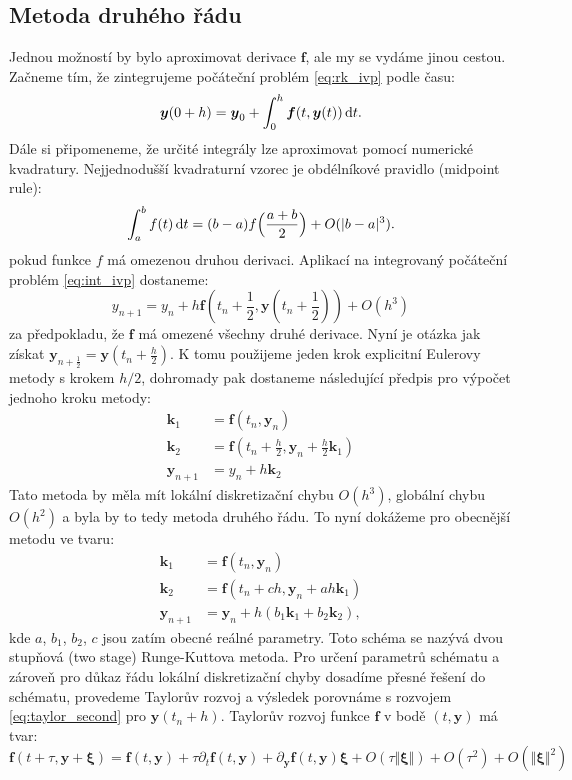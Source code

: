 \documentclass[a4paper, 12pt]{book}
\theoremstyle{definition}
\def\d{\,{\rm d}}               %
\def\vc#1{\mathbf{\boldsymbol{#1}}}     %
\def\abs#1{\lvert#1\rvert}
\def\norm#1{\bigl\Vert#1\bigr\Vert} %
\def\prtl{\partial}                                        %
\begin{document}
\subsection{Metoda druhého řádu}
Jednou možností by bylo aproximovat derivace $\vc f$, ale my se vydáme jinou cestou. Začneme tím, že zintegrujeme počáteční problém \eqref{eq:rk_ivp}
podle času:
\begin{equation}
   \label{eq:int_ivp}
   \vc y(0 + h) = \vc y_0 + \int_{0}^h \vc f(t, \vc y(t)) \d t.
\end{equation}
Dále si připomeneme, že určité integrály lze aproximovat pomocí numerické kvadratury. Nejjednodušší kvadraturní vzorec je obdélníkové pravidlo
(midpoint rule):
\[
    \int_a^b f(t) \d t = (b-a)f\Big(\frac{a+b}{2}\Big) + O(\abs{b-a}^3).
\]
pokud funkce $f$ má omezenou druhou derivaci. Aplikací na integrovaný počáteční problém \eqref{eq:int_ivp} dostaneme:
\[
    y_{n+1} = y_n + h\vc f(t_n + \frac12, \vc y(t_n + \frac12)) + O(h^3)
\]
za předpokladu, že $\vc f$ má omezené všechny druhé derivace. Nyní je otázka jak získat $\vc y_{n+\frac12} = \vc y(t_n + \frac{h}{2})$.
K tomu použijeme jeden krok explicitní Eulerovy metody s krokem $h/2$, dohromady pak dostaneme následující předpis pro výpočet jednoho kroku metody:
\begin{align}
    \label{eq:midpoint_rule}
    \vc k_1 &= \vc f(t_n, \vc y_n)\\
    \vc k_2 &= \vc f(t_n + \frac{h}{2}, \vc y_n + \frac{h}{2} \vc k_1)\\
    \vc y_{n+1} &= y_n + h \vc k_2 
\end{align}
Tato metoda by měla mít lokální diskretizační chybu $O(h^3)$, globální chybu $O(h^2)$ a byla by to tedy metoda druhého řádu. To nyní dokážeme
pro obecnější metodu ve tvaru:
\begin{align}
    \label{eq:rk2}
    \vc k_1 &= \vc f(t_n, \vc y_n)\\
    \vc k_2 &= \vc f(t_n + ch, \vc y_n + ah\vc k_1)\\
    \vc y_{n+1} &= \vc y_n + h(b_1 \vc k_1 + b_2 \vc k_2),
\end{align}
kde $a$, $b_1$, $b_2$, $c$ jsou zatím obecné reálné parametry. Toto schéma se nazývá dvou stupňová (two stage) Runge-Kuttova metoda.
Pro určení parametrů schématu a zároveň pro důkaz řádu lokální diskretizační chyby dosadíme přesné řešení do schématu, provedeme Taylorův rozvoj 
a výsledek porovnáme s rozvojem \eqref{eq:taylor_second} pro $\vc y(t_n + h)$. Taylorův rozvoj funkce $\vc f$ v bodě $(t, \vc y)$ má tvar:
\begin{equation}
    \label{eq:taylor_f}
    \vc f(t + \tau, \vc y + \vc \xi) = \vc f(t,\vc y) + \tau \prtl_t \vc f(t,\vc y) + \prtl_{\vc y} \vc f(t, \vc y) \vc \xi  
     + O(\tau \norm{\vc \xi}) + O(\tau^2) + O(\norm{\vc \xi}^2)
\end{equation}
\end{document}
